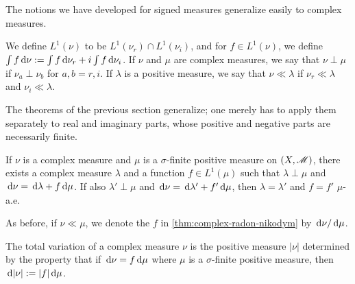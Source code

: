 \documentclass[12pt]{article} %
\begin{document}
The notions we have developed for signed measures generalize easily to complex measures. 

\begin{definition}
    We define $L^1(\nu)$ to be $L^1(\nu_r) \cap L^1(\nu_i)$, and for $f \in L^1(\nu)$, we define $\int f \, \mathrm{d} \nu: = \int f \, \mathrm{d}\nu_r + i \int f \, \mathrm{d}\nu_i$. If $\nu$ and $\mu$ are complex measures, we say that $\nu \perp \mu$ if $\nu_a \perp \nu_b$ for $a, b = r, i$. If $\lambda$ is a positive measure, we say that $\nu \ll \lambda$ if $\nu_r \ll \lambda$ and $\nu_i \ll \lambda$.
\end{definition}

\noindent The theorems of the previous section generalize; one merely has to apply them separately to real and imaginary parts, whose positive and negative parts are necessarily finite.

\begin{theorem}\label{thm:complex-radon-nikodym}
    If $\nu$ is a complex measure and $\mu$ is a $\sigma$-finite positive measure on $(X, \mathscr{M})$, there exists a complex measure $\lambda$ and a function $f \in L^1(\mu)$ such that $\lambda \perp \mu$ and $\, \mathrm{d}\nu = \, \mathrm{d}\lambda + f \, \mathrm{d}\mu$. If also $\lambda' \perp \mu$ and $\, \mathrm{d}\nu = \, \mathrm{d}\lambda' + f'\, \mathrm{d}\mu$, then $\lambda = \lambda'$ and $f = f'$ $\mu$-a.e.
\end{theorem}

\noindent As before, if $\nu \ll \mu$, we denote the $f$ in \cref{thm:complex-radon-nikodym} by $\, \mathrm{d}\nu / \, \mathrm{d}\mu$.

\begin{definition}
    The total variation of a complex measure $\nu$ is the positive measure $|\nu|$ determined by the property that if $\, \mathrm{d}\nu = f\, \mathrm{d}\mu$ where $\mu$ is a $\sigma$-finite positive measure, then $\, \mathrm{d}|\nu| := |f|\, \mathrm{d}\mu$.
\end{definition}
\end{document}
